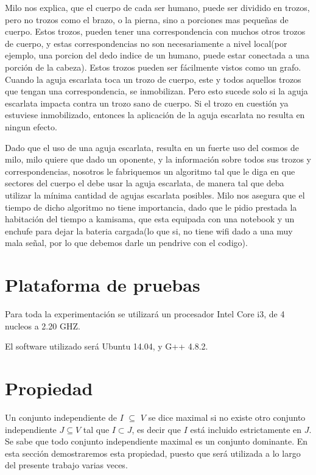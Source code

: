 \documentclass[a4paper]{article}
\begin{document}
\begin{enumerate}
Milo nos explica, que el cuerpo de cada ser humano, puede ser dividido en trozos, pero no trozos como el brazo, o la pierna, sino a porciones mas pequeñas de cuerpo. Estos trozos, pueden tener una correspondencia con muchos otros trozos de cuerpo, y estas correspondencias no son necesariamente a nivel local(por ejemplo, una porcion del dedo indice de un humano, puede estar conectada a una porción de la cabeza). Estos trozos pueden ser fácilmente vistos como un grafo. Cuando la aguja escarlata toca un trozo de cuerpo, este y todos aquellos trozos que tengan una correspondencia, se inmobilizan. Pero esto sucede solo si la aguja escarlata impacta contra un trozo sano de cuerpo. Si el trozo en cuestión ya estuviese inmobilizado, entonces la aplicación de la aguja escarlata no resulta en ningun efecto.

Dado que el uso de una aguja escarlata, resulta en un fuerte uso del cosmos de milo, milo quiere que dado un oponente, y la información sobre todos sus trozos y correspondencias, nosotros le fabriquemos un algoritmo tal que le diga en que sectores del cuerpo el debe usar la aguja escarlata, de manera tal que deba utilizar la mínima cantidad de agujas escarlata posibles. Milo nos asegura que el tiempo de dicho algoritmo no tiene importancia, dado que le pidio prestada la habitación del tiempo a kamisama, que esta equipada con una notebook y un enchufe para dejar la bateria cargada(lo que si, no tiene wifi dado a una muy mala señal, por lo que debemos darle un pendrive con el codigo).


\end{enumerate} 

\section{Plataforma de pruebas}

Para toda la experimentación se utilizará un procesador Intel Core i3, de 4 nucleos a 2.20 GHZ.

El software utilizado será Ubuntu 14.04, y G++ 4.8.2.
\newpage
\section{Propiedad}
Un conjunto independiente de $I$ $\subseteq$ $V$ se dice maximal si no existe otro conjunto independiente $J \subseteq V$ tal que $I \subset J$, es decir que $I$ está incluido estrictamente en $J$. Se sabe que todo conjunto independiente maximal es un conjunto dominante. En esta sección demostraremos esta propiedad, puesto que será utilizada a lo largo del presente trabajo varias veces.
\end{document}
